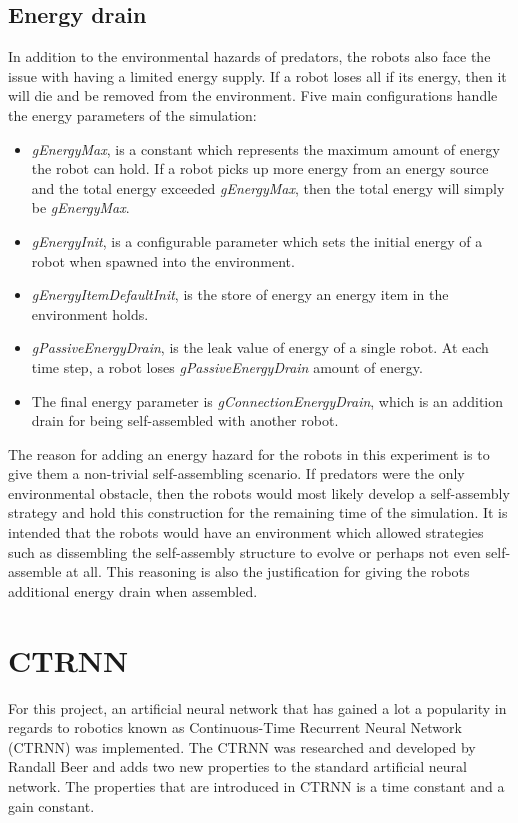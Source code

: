 \subsection{Energy drain}
In addition to the environmental hazards of predators, the robots also  face the issue with having a limited energy supply.
If a robot loses all if its energy, then it will die and be removed from the environment.
Five main configurations handle the energy parameters of the simulation:

\begin{itemize}
	
	\item \emph{gEnergyMax}, is a constant which represents the maximum amount of energy the robot can hold.
	If a robot picks up more energy from an energy source and the total energy exceeded \emph{gEnergyMax}, then the total energy will simply be \emph{gEnergyMax}.
	
	\item \emph{gEnergyInit}, is a configurable parameter which sets the initial energy of a robot when spawned into the environment.
	
	\item \emph{gEnergyItemDefaultInit}, is the store of energy an energy item in the environment holds.
	
	\item \emph{gPassiveEnergyDrain}, is the leak value of energy of a single robot. At each time step, a robot loses \emph{gPassiveEnergyDrain} amount of energy.
	
	\item The final energy parameter is \emph{gConnectionEnergyDrain}, which is an addition drain for being self-assembled with another robot.
	
	
\end{itemize}


The reason for adding an energy hazard for the robots in this experiment is to give them a non-trivial self-assembling scenario.
If predators were the only environmental obstacle, then the robots would most likely develop a self-assembly strategy and hold this construction for the remaining time of the simulation.
It is intended that the robots would have an environment which allowed strategies such as dissembling the self-assembly structure to evolve or perhaps not even self-assemble at all.
This reasoning is also the justification for giving the robots additional energy drain when assembled.

\section{CTRNN}
\label{sec:ctrnn}
For this project, an artificial neural network that has gained a lot a popularity in regards to robotics known as Continuous-Time Recurrent Neural Network (CTRNN) was implemented. 
The CTRNN was researched and developed by Randall Beer\cite{beer_dynamics_1997} and adds two new properties to the standard artificial neural network. 
The properties that are introduced in CTRNN is a time constant and a gain constant.

